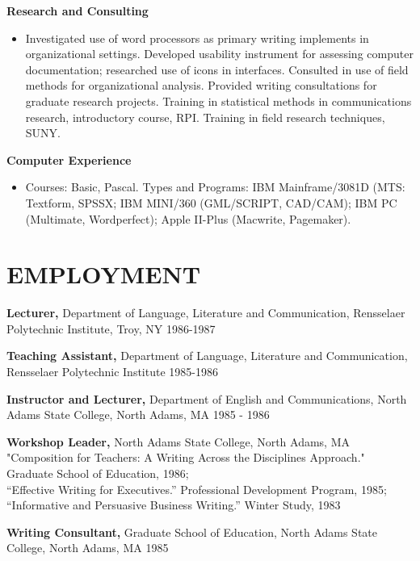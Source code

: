 \documentclass{res}
\begin{document}
\begin{resume}
   {\bf  Research and Consulting} 
        \begin{itemize}
        \item[]  Investigated use of word processors as primary writing 
        implements in organizational settings. Developed 
        usability instrument for assessing computer 
        documentation; researched use of icons in interfaces. 
        Consulted in use of field methods for organizational 
        analysis. Provided writing consultations for graduate 
        research projects. Training in statistical methods in 
        communications research, introductory course, RPI. 
        Training in field research techniques, SUNY. 
       \end{itemize} 

   {\bf Computer Experience} 
        \begin{itemize}
        \item[] Courses: Basic, Pascal. Types and Programs: IBM 
        Mainframe/3081D (MTS: Textform, SPSSX; IBM MINI/360 
        (GML/SCRIPT, CAD/CAM); IBM PC (Multimate, Wordperfect); 
        Apple II-Plus (Macwrite, Pagemaker). 
        \end{itemize}
 
\section{EMPLOYMENT} 
\vspace{0.1in} 
    {\bf Lecturer,} Department of Language, Literature and 
    Communication, Rensselaer Polytechnic Institute, Troy, NY 
    1986-1987 
 
    {\bf Teaching Assistant,} Department of Language, Literature and 
    Communication, Rensselaer Polytechnic Institute  1985-1986 
 
    {\bf Instructor and Lecturer,} Department of English and 
    Communications, North Adams State College, North Adams, MA 
    1985 - 1986 
 
    {\bf Workshop Leader,} North Adams State College, North Adams, MA \\
    "Composition for Teachers: A Writing Across the Disciplines 
    Approach." Graduate School of Education, 1986; \\
    ``Effective Writing for Executives.'' Professional Development 
    Program, 1985; ``Informative and Persuasive Business Writing.''
    Winter Study, 1983 
 
    {\bf Writing Consultant,} Graduate School of Education, North Adams 
    State College, North Adams, MA  1985 
 

\end{resume}
\end{document}
